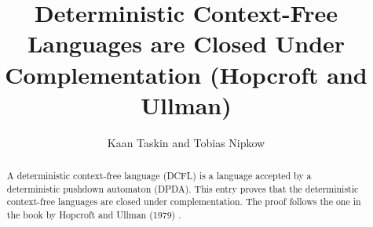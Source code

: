 \documentclass[11pt,a4paper]{article}
\begin{document}
\title{Deterministic Context-Free Languages are Closed Under
  Complementation (Hopcroft and Ullman)}
\author{Kaan Taskin and Tobias Nipkow}
\maketitle

\begin{abstract}
A deterministic context-free language (DCFL) is a language accepted by a deterministic pushdown automaton (DPDA).
This entry proves that the deterministic context-free languages are closed under complementation.
The proof follows the one in the book by Hopcroft and Ullman (1979) \cite{HopcroftU79}.
\end{abstract}

\tableofcontents





\end{document}
